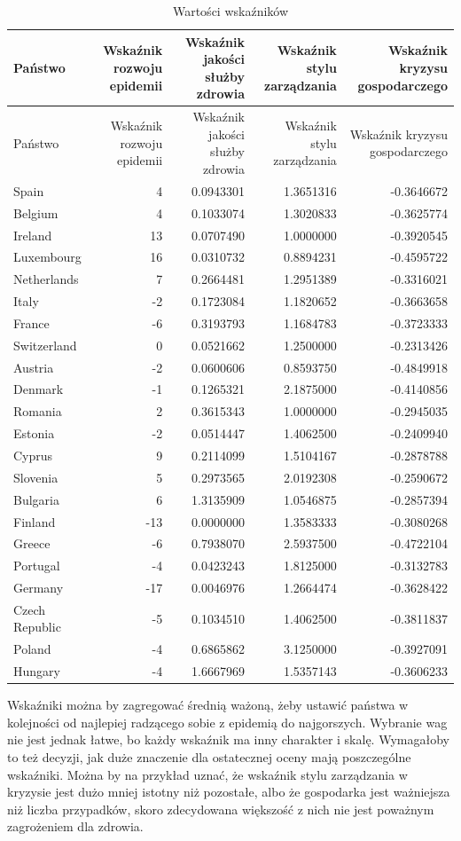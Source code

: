 \documentclass[
]{article}
\begin{document}
\begin{longtable}[]{@{}lrrrr@{}}
\caption{Wartości wskaźników}\tabularnewline
\toprule
Państwo & Wskaźnik rozwoju epidemii & Wskaźnik jakości służby zdrowia &
Wskaźnik stylu zarządzania & Wskaźnik kryzysu
gospodarczego\tabularnewline
\midrule
\endfirsthead
\toprule
Państwo & Wskaźnik rozwoju epidemii & Wskaźnik jakości służby zdrowia &
Wskaźnik stylu zarządzania & Wskaźnik kryzysu
gospodarczego\tabularnewline
\midrule
\endhead
Spain & 4 & 0.0943301 & 1.3651316 & -0.3646672\tabularnewline
Belgium & 4 & 0.1033074 & 1.3020833 & -0.3625774\tabularnewline
Ireland & 13 & 0.0707490 & 1.0000000 & -0.3920545\tabularnewline
Luxembourg & 16 & 0.0310732 & 0.8894231 & -0.4595722\tabularnewline
Netherlands & 7 & 0.2664481 & 1.2951389 & -0.3316021\tabularnewline
Italy & -2 & 0.1723084 & 1.1820652 & -0.3663658\tabularnewline
France & -6 & 0.3193793 & 1.1684783 & -0.3723333\tabularnewline
Switzerland & 0 & 0.0521662 & 1.2500000 & -0.2313426\tabularnewline
Austria & -2 & 0.0600606 & 0.8593750 & -0.4849918\tabularnewline
Denmark & -1 & 0.1265321 & 2.1875000 & -0.4140856\tabularnewline
Romania & 2 & 0.3615343 & 1.0000000 & -0.2945035\tabularnewline
Estonia & -2 & 0.0514447 & 1.4062500 & -0.2409940\tabularnewline
Cyprus & 9 & 0.2114099 & 1.5104167 & -0.2878788\tabularnewline
Slovenia & 5 & 0.2973565 & 2.0192308 & -0.2590672\tabularnewline
Bulgaria & 6 & 1.3135909 & 1.0546875 & -0.2857394\tabularnewline
Finland & -13 & 0.0000000 & 1.3583333 & -0.3080268\tabularnewline
Greece & -6 & 0.7938070 & 2.5937500 & -0.4722104\tabularnewline
Portugal & -4 & 0.0423243 & 1.8125000 & -0.3132783\tabularnewline
Germany & -17 & 0.0046976 & 1.2664474 & -0.3628422\tabularnewline
Czech Republic & -5 & 0.1034510 & 1.4062500 & -0.3811837\tabularnewline
Poland & -4 & 0.6865862 & 3.1250000 & -0.3927091\tabularnewline
Hungary & -4 & 1.6667969 & 1.5357143 & -0.3606233\tabularnewline
\bottomrule
\end{longtable}

Wskaźniki można by zagregować średnią ważoną, żeby ustawić państwa w
kolejności od najlepiej radzącego sobie z epidemią do najgorszych.
Wybranie wag nie jest jednak łatwe, bo każdy wskaźnik ma inny charakter
i skalę. Wymagałoby to też decyzji, jak duże znaczenie dla ostatecznej
oceny mają poszczególne wskaźniki. Można by na przykład uznać, że
wskaźnik stylu zarządzania w kryzysie jest dużo mniej istotny niż
pozostałe, albo że gospodarka jest ważniejsza niż liczba przypadków,
skoro zdecydowana większość z nich nie jest poważnym zagrożeniem dla
zdrowia.
\end{document}
